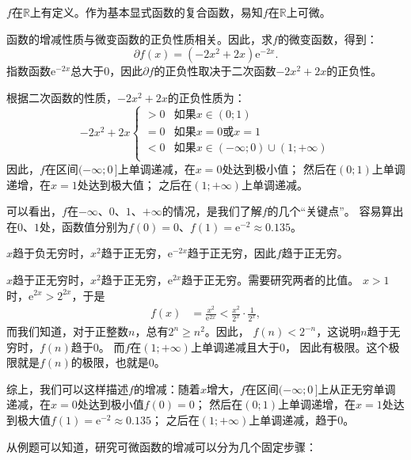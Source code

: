 \documentclass[12pt,UTF8]{ctexbook}
\begin{document}
\begin{so}
    $f$在$\mathbb{R}$上有定义。作为基本显式函数的复合函数，易知$f$在$\mathbb{R}$上可微。

    函数的增减性质与微变函数的正负性质相关。因此，求$f$的微变函数，得到：
    $$ \partial f(x) = (-2x^2 + 2x) \mathrm{e}^{-2x}.$$
    指数函数$ \mathrm{e}^{-2x} $总大于$0$，因此$ \partial f $的正负性取决于二次函数$-2x^2 + 2x$的正负性。
    
    根据二次函数的性质，$-2x^2 + 2x$的正负性质为：
    $$ -2x^2 + 2x \left\{
        \begin{array}{cl}
            > 0 & \mbox{如果}x \in (0; 1) \\
            = 0 & \mbox{如果}x = 0 \mbox{或} x = 1 \\
            < 0 & \mbox{如果}x \in (-\infty; 0)\cup (1; +\infty)\\
        \end{array}\right.
    $$
    因此，$f$在区间$(-\infty; 0\,]$上单调递减，在$x = 0$处达到极小值；
    然后在$(0; 1)$上单调递增，在$x = 1$处达到极大值；
    之后在$(1; +\infty)$上单调递减。

    可以看出，$f$在$-\infty$、$0$、$1$、$+\infty$的情况，是我们了解$f$的几个“关键点”。
    容易算出在$0$、$1$处，函数值分别为$f(0) = 0$、$f(1) = \mathrm{e}^{-2} \approx 0.135$。
    
    $x$趋于负无穷时，$x^2$趋于正无穷，$\mathrm{e}^{-2x}$趋于正无穷，因此$f$趋于正无穷。

    $x$趋于正无穷时，$x^2$趋于正无穷，$\mathrm{e}^{2x}$趋于正无穷。需要研究两者的比值。
    $x > 1$时，$\mathrm{e}^{2x} > 2^{2x}$，于是
    \begin{align*}
        f(x) &= \frac{x^2}{\mathrm{e}^{2x}} < \frac{x^2}{2^x} \cdot \frac{1}{2^x}, 
    \end{align*} 
    而我们知道，对于正整数$n$，总有$2^n \geqslant n^2$。因此，
    $f(n) < 2^{-n}$，这说明$n$趋于无穷时，$f(n)$趋于$0$。
    而$f$在$(1;+\infty)$上单调递减且大于$0$，
    因此有极限。这个极限就是$f(n)$的极限，也就是$0$。

    综上，我们可以这样描述$f$的增减：随着$x$增大，$f$在区间$(-\infty; 0\,]$上从正无穷单调递减，在$x = 0$处达到极小值$f(0) = 0$；
    然后在$(0; 1)$上单调递增，在$x = 1$处达到极大值$f(1) = \mathrm{e}^{-2} \approx 0.135$；
    之后在$(1; +\infty)$上单调递减，趋于$0$。
\end{so}

从例题可以知道，研究可微函数的增减可以分为几个固定步骤：

\begin{center}
\end{center}
\end{document}
